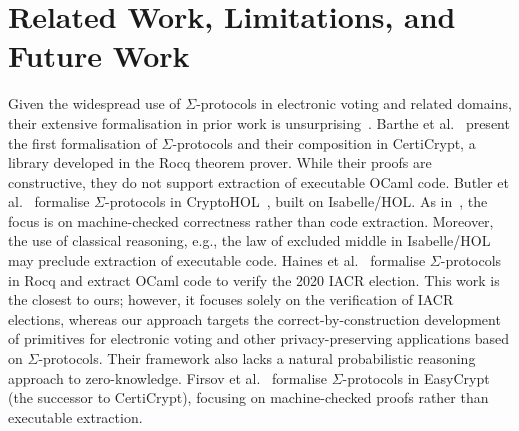 \documentclass[sigconf, anonymous]{acmart}
\begin{document}
  


\section{Related Work, Limitations, and Future Work}\label{rel_work}
Given the widespread use of $\Sigma$-protocols in electronic voting and related domains, their extensive formalisation in prior work is unsurprising~\cite{5552642,9519460,butler2021formalising,10.1145/3319535.3354247,287095,almeida2010certifying,10221929,10.1145/3594735}.  Barthe et al.~\cite{5552642} present the first formalisation of $\Sigma$-protocols and their composition in CertiCrypt, a library developed in the Rocq theorem prover. While their proofs are constructive, they do not support extraction of executable OCaml code. Butler et al.~\cite{butler2021formalising} formalise $\Sigma$-protocols in CryptoHOL~\cite{10.1007/978-3-662-49498-1_20}, built on Isabelle/HOL. As in~\cite{5552642}, the focus is on machine-checked correctness rather than code extraction. Moreover, the use of classical reasoning, e.g., the law of excluded middle in Isabelle/HOL may preclude extraction of executable code. Haines et al.~\cite{287095} formalise $\Sigma$-protocols in Rocq and extract OCaml code to verify the 2020 IACR election. This work is the closest to ours; however, it focuses solely on the verification of IACR elections, whereas our approach targets the correct-by-construction development of primitives for electronic voting and other privacy-preserving applications based on $\Sigma$-protocols. Their framework also lacks a natural probabilistic reasoning approach to zero-knowledge. Firsov et al.~\cite{10221929} formalise $\Sigma$-protocols in EasyCrypt (the successor to CertiCrypt), focusing on machine-checked proofs rather than executable extraction. 

  
\end{document}
